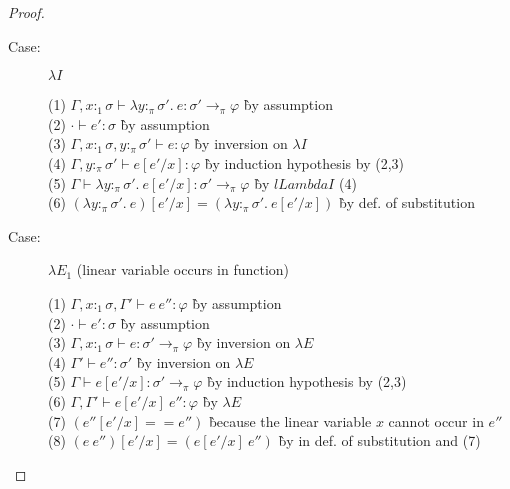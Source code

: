 \begin{proof}
\begin{description}
\item[Case:] $\lambda I$
\begin{tabbing}
  (1) $\Gamma, x{:}_1\sigma \vdash \lambda y{:}_\pi\sigma'.~e : \sigma' \to_\pi \varphi$ \` by assumption\\
  (2) $\cdot \vdash e' : \sigma$ \` by assumption\\
  (3) $\Gamma, x{:}_1\sigma, y{:}_\pi\sigma' \vdash e : \varphi$ \` by inversion on $\lambda I$\\
  (4) $\Gamma, y{:}_\pi\sigma' \vdash e[e'/x] : \varphi$ \` by induction hypothesis by (2,3)\\
  (5) $\Gamma \vdash \lambda y{:}_\pi\sigma'.~e[e'/x] : \sigma' \to_\pi \varphi$ \` by $lLambda I$ (4)\\
  (6) $(\lambda y{:}_\pi\sigma'.~e)[e'/x] = (\lambda y{:}_\pi\sigma'.~e[e'/x])$ \` by def. of substitution\\
\end{tabbing}

\item[Case:] $\lambda E_1$ (linear variable occurs in function)
\begin{tabbing}
  (1) $\Gamma, x{:}_1\sigma, \Gamma' \vdash e~e'' : \varphi$ \` by assumption\\
  (2) $\cdot \vdash e' : \sigma$ \` by assumption\\
  (3) $\Gamma, x{:}_1\sigma \vdash e : \sigma' \to_\pi \varphi$ \` by inversion on $\lambda E$\\
  (4) $\Gamma' \vdash e'' : \sigma'$ \` by inversion on $\lambda E$\\
  (5) $\Gamma \vdash e[e'/x] : \sigma' \to_\pi \varphi$ \` by induction hypothesis by (2,3)\\
  (6) $\Gamma, \Gamma' \vdash e[e'/x]~e'' : \varphi$ \` by $\lambda E$\\
  (7) $(e''[e'/x] == e'')$ \` because the linear variable $x$ cannot occur in $e''$\\
  (8) $(e~e'')[e'/x] = (e[e'/x]~e'')$ \` by in def. of substitution and (7)\\
\end{tabbing}


\end{description}
\end{proof}
